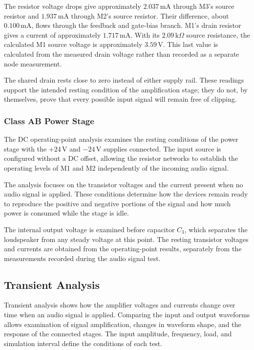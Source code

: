 \documentclass[conference]{IEEEtran}
\begin{document}
The resistor voltage drops give approximately $2.037\,\mathrm{mA}$ through M3's source resistor and $1.937\,\mathrm{mA}$ through M2's source resistor. Their difference, about $0.100\,\mathrm{mA}$, flows through the feedback and gate-bias branch. M1's drain resistor gives a current of approximately $1.717\,\mathrm{mA}$. With its $2.09\,\mathrm{k}\Omega$ source resistance, the calculated M1 source voltage is approximately $3.59\,\mathrm{V}$. This last value is calculated from the measured drain voltage rather than recorded as a separate node measurement.

The shared drain rests close to zero instead of either supply rail. These readings support the intended resting condition of the amplification stage; they do not, by themselves, prove that every possible input signal will remain free of clipping.

\subsubsection{Class AB Power Stage}
The DC operating-point analysis examines the resting conditions of the power stage with the $+24\,\mathrm{V}$ and $-24\,\mathrm{V}$ supplies connected. The input source is configured without a DC offset, allowing the resistor networks to establish the operating levels of M1 and M2 independently of the incoming audio signal.

The analysis focuses on the transistor voltages and the current present when no audio signal is applied. These conditions determine how the devices remain ready to reproduce the positive and negative portions of the signal and how much power is consumed while the stage is idle.

The internal output voltage is examined before capacitor $C_3$, which separates the loudspeaker from any steady voltage at this point. The resting transistor voltages and currents are obtained from the operating-point results, separately from the measurements recorded during the audio signal test.

\subsection{Transient Analysis}
Transient analysis shows how the amplifier voltages and currents change over time when an audio signal is applied. Comparing the input and output waveforms allows examination of signal amplification, changes in waveform shape, and the response of the connected stages. The input amplitude, frequency, load, and simulation interval define the conditions of each test.
\end{document}
